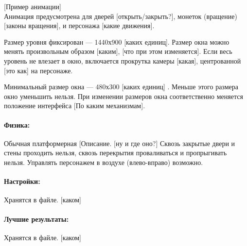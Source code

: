 \documentclass[12pt,a4paper]{article}
\begin{document}
{\color{blue}[Пример анимации]}\\

Анимация предусмотрена для дверей {\color{red} [открыть/закрыть?]}\ans{[Да]}, монеток (вращение) {\color{red} [законы вращения]}, и персонажа {\color{red} [какие движения]}.

Размер уровня фиксирован --- 1440х900 {\color{red} [каких единиц]}.\ans{[Пикселей]} Размер окна можно менять произвольным образом {\color{red} [каким], [что при этом изменяется]}. Если весь уровень не влезает в окно, включается прокрутка камеры {\color{red} [какая]}, центрованной {\color{red} [это как]} на персонаже.

Минимальный размер окна --- 480х300 {\color{red} [каких единиц]} \ans{[Пикселей]}. Меньше этого размера окно уменьшить нельзя. При изменении размеров окна соответственно меняется положение интерфейса{\color{red} [По каким механизмам]}.

\paragraph{Физика:}
Обычная платформерная {\color{red} [Описание}\ans{:]}. {\color{red} [ну и где оно?]} Сквозь закрытые двери и стены {\color{red} про}ходить нельзя, сквозь перекрытия проваливаться и пропрыгивать нельзя. Управлять персонажем в воздухе (влево-вправо) возможно.

\paragraph{Настройки:}
Хранятся в файле. {\color{red} [каком]}

\paragraph{Лучшие результаты:}
Хранятся в файле. {\color{red} [каком]}
\end{document}
